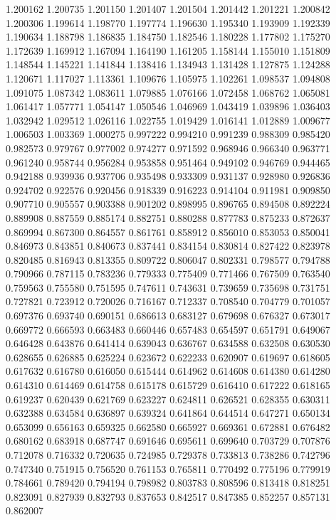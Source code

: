 1.200162
1.200735
1.201150
1.201407
1.201504
1.201442
1.201221
1.200842
1.200306
1.199614
1.198770
1.197774
1.196630
1.195340
1.193909
1.192339
1.190634
1.188798
1.186835
1.184750
1.182546
1.180228
1.177802
1.175270
1.172639
1.169912
1.167094
1.164190
1.161205
1.158144
1.155010
1.151809
1.148544
1.145221
1.141844
1.138416
1.134943
1.131428
1.127875
1.124288
1.120671
1.117027
1.113361
1.109676
1.105975
1.102261
1.098537
1.094808
1.091075
1.087342
1.083611
1.079885
1.076166
1.072458
1.068762
1.065081
1.061417
1.057771
1.054147
1.050546
1.046969
1.043419
1.039896
1.036403
1.032942
1.029512
1.026116
1.022755
1.019429
1.016141
1.012889
1.009677
1.006503
1.003369
1.000275
0.997222
0.994210
0.991239
0.988309
0.985420
0.982573
0.979767
0.977002
0.974277
0.971592
0.968946
0.966340
0.963771
0.961240
0.958744
0.956284
0.953858
0.951464
0.949102
0.946769
0.944465
0.942188
0.939936
0.937706
0.935498
0.933309
0.931137
0.928980
0.926836
0.924702
0.922576
0.920456
0.918339
0.916223
0.914104
0.911981
0.909850
0.907710
0.905557
0.903388
0.901202
0.898995
0.896765
0.894508
0.892224
0.889908
0.887559
0.885174
0.882751
0.880288
0.877783
0.875233
0.872637
0.869994
0.867300
0.864557
0.861761
0.858912
0.856010
0.853053
0.850041
0.846973
0.843851
0.840673
0.837441
0.834154
0.830814
0.827422
0.823978
0.820485
0.816943
0.813355
0.809722
0.806047
0.802331
0.798577
0.794788
0.790966
0.787115
0.783236
0.779333
0.775409
0.771466
0.767509
0.763540
0.759563
0.755580
0.751595
0.747611
0.743631
0.739659
0.735698
0.731751
0.727821
0.723912
0.720026
0.716167
0.712337
0.708540
0.704779
0.701057
0.697376
0.693740
0.690151
0.686613
0.683127
0.679698
0.676327
0.673017
0.669772
0.666593
0.663483
0.660446
0.657483
0.654597
0.651791
0.649067
0.646428
0.643876
0.641414
0.639043
0.636767
0.634588
0.632508
0.630530
0.628655
0.626885
0.625224
0.623672
0.622233
0.620907
0.619697
0.618605
0.617632
0.616780
0.616050
0.615444
0.614962
0.614608
0.614380
0.614280
0.614310
0.614469
0.614758
0.615178
0.615729
0.616410
0.617222
0.618165
0.619237
0.620439
0.621769
0.623227
0.624811
0.626521
0.628355
0.630311
0.632388
0.634584
0.636897
0.639324
0.641864
0.644514
0.647271
0.650134
0.653099
0.656163
0.659325
0.662580
0.665927
0.669361
0.672881
0.676482
0.680162
0.683918
0.687747
0.691646
0.695611
0.699640
0.703729
0.707876
0.712078
0.716332
0.720635
0.724985
0.729378
0.733813
0.738286
0.742796
0.747340
0.751915
0.756520
0.761153
0.765811
0.770492
0.775196
0.779919
0.784661
0.789420
0.794194
0.798982
0.803783
0.808596
0.813418
0.818251
0.823091
0.827939
0.832793
0.837653
0.842517
0.847385
0.852257
0.857131
0.862007
